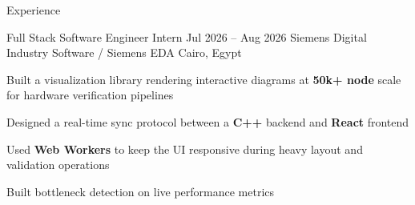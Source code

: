\begin{rSection}{Experience}

\resumeExperienceEntry
	{Full Stack Software Engineer Intern}
	{Jul 2026 -- Aug 2026}
	{Siemens Digital Industry Software / Siemens EDA}
	{Cairo, Egypt}
	{
	\item Built a visualization library rendering interactive diagrams at \textbf{50k+ node} scale for hardware verification pipelines
	\item Designed a real-time sync protocol between a \textbf{C++} backend and \textbf{React} frontend
	\item Used \textbf{Web Workers} to keep the UI responsive during heavy layout and validation operations
	\item Built bottleneck detection on live performance metrics
	}
\end{rSection}